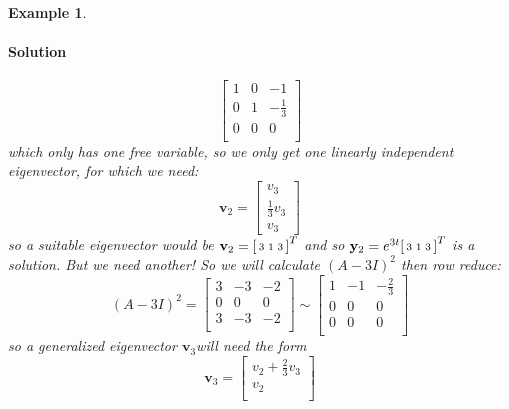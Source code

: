 \documentclass[letterpaper, 11pt, openany]{book}
\theoremstyle{mytheoremstyle}
\theoremstyle{myexamplestyle}
\newtheorem{example}{Example}[section]
\newenvironment{solution}{\paragraph{\sffamily \smaller \fontseries{b}\selectfont Solution}}{\hfill\faSquare}
\begin{document}
\begin{example}
\begin{enumerate}
\begin{solution}
\[                        \left[
                        \begin{array}{ccc}
                        1 & 0 & -1 \\
                        0 & 1 & -\frac{1}{3} \\
                        0 & 0 & 0 \\
                        \end{array}
                        \right]
            \]
            which only has one free variable, so we only get one linearly independent eigenvector, for which we need:
            \[\mathbf{v}_2 = \begin{bmatrix}v_3 \\ \frac{1}{3}v_3 \\ v_3\end{bmatrix}\]
            so a suitable eigenvector would be \(\mathbf{v}_2 = \begin{bsmallmatrix}3 & 1 &3\end{bsmallmatrix}^{T}\) and so \(\mathbf{y}_2 = e^{3t} \begin{bsmallmatrix}3 & 1 &3\end{bsmallmatrix}^{T}\) is a solution. But we need another! So we will calculate \((A-3I)^2\) then row reduce:
            \[ (A-3I)^2 =   \left[
                            \begin{array}{ccc}
                            3 & -3 & -2 \\
                            0 & 0 & 0 \\
                            3 & -3 & -2 \\
                            \end{array}
                            \right]
                            \sim
                            \left[
                            \begin{array}{ccc}
                            1 & -1 & -\frac{2}{3} \\
                            0 & 0 & 0 \\
                            0 & 0 & 0 \\
                            \end{array}
                            \right]
            \]
            so a generalized eigenvector \(\mathbf{v}_3\)will need the form
            \[ \mathbf{v}_3 = \begin{bmatrix}
                v_2 + \frac{2}{3}v_3\\
                v_2\\

\end{bmatrix}\]
\end{solution}
\end{enumerate}
\end{example}
\end{document}
